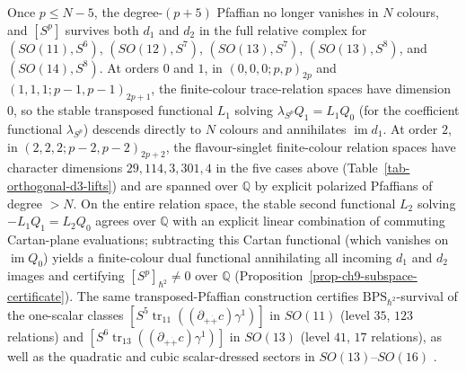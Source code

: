 \documentclass[11pt]{article}
\numberwithin{equation}{section}
\numberwithin{figure}{section}
\numberwithin{table}{section}
\begin{document}
Once $p\le N-5$, the degree-$(p+5)$ Pfaffian no longer vanishes in $N$ colours, and $[S^p]$ survives both $d_1$ and $d_2$ in the full relative complex for $(SO(11),S^6)$, $(SO(12),S^7)$, $(SO(13),S^7)$, $(SO(13),S^8)$, and $(SO(14),S^8)$. At orders $0$ and $1$, in $(0,0,0;p,p)_{2p}$ and $(1,1,1;p-1,p-1)_{2p+1}$, the finite-colour trace-relation spaces have dimension $0$, so the stable transposed functional $L_1$ solving $\lambda_{S^p}Q_1=L_1Q_0$ (for the coefficient functional $\lambda_{S^p}$) descends directly to $N$ colours and annihilates $\operatorname{im}d_1$. At order $2$, in $(2,2,2;p-2,p-2)_{2p+2}$, the flavour-singlet finite-colour relation spaces have character dimensions $29,114,3,301,4$ in the five cases above (Table~\ref{tab-orthogonal-d3-lifts}) and are spanned over $\mathbb Q$ by explicit polarized Pfaffians of degree $>N$. On the entire relation space, the stable second functional $L_2$ solving $-L_1Q_1=L_2Q_0$ agrees over $\mathbb Q$ with an explicit linear combination of commuting Cartan-plane evaluations; subtracting this Cartan functional (which vanishes on $\operatorname{im}Q_0$) yields a finite-colour dual functional annihilating all incoming $d_1$ and $d_2$ images and certifying $[S^p]_{\hbar^2}\ne0$ over $\mathbb Q$ (Proposition~\ref{prop-ch9-subspace-certificate}). The same transposed-Pfaffian construction certifies $\mathrm{BPS}_{\hbar^2}$-survival of the one-scalar classes $[S^5\operatorname{tr}_{11}((\partial_{+\dot+}c)\gamma^1)]$ in $SO(11)$ (level $35$, $123$ relations) and $[S^6\operatorname{tr}_{13}((\partial_{+\dot+}c)\gamma^1)]$ in $SO(13)$ (level $41$, $17$ relations), as well as the quadratic and cubic scalar-dressed sectors in $SO(13)$--$SO(16)$ \cite{Repo}.
\end{document}
